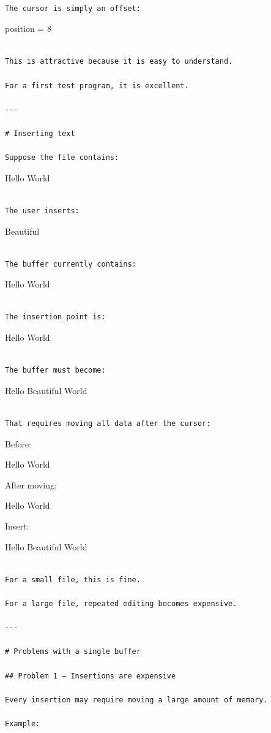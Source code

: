 \documentclass[
  oneside,
  openany]{book}
\begin{document}
\begin{verbatim}

The cursor is simply an offset:
\end{verbatim}

position = 8

\begin{verbatim}

This is attractive because it is easy to understand.

For a first test program, it is excellent.

---

# Inserting text

Suppose the file contains:
\end{verbatim}

Hello World

\begin{verbatim}

The user inserts:
\end{verbatim}

Beautiful

\begin{verbatim}

The buffer currently contains:
\end{verbatim}

Hello World

\begin{verbatim}

The insertion point is:
\end{verbatim}

Hello \textbar World

\begin{verbatim}

The buffer must become:
\end{verbatim}

Hello Beautiful World

\begin{verbatim}

That requires moving all data after the cursor:
\end{verbatim}

Before:

Hello \textbar World

After moving:

Hello \textbar{} World

Insert:

Hello Beautiful World

\begin{verbatim}

For a small file, this is fine.

For a large file, repeated editing becomes expensive.

---

# Problems with a single buffer

## Problem 1 — Insertions are expensive

Every insertion may require moving a large amount of memory.

Example:
\end{verbatim}
\end{document}
